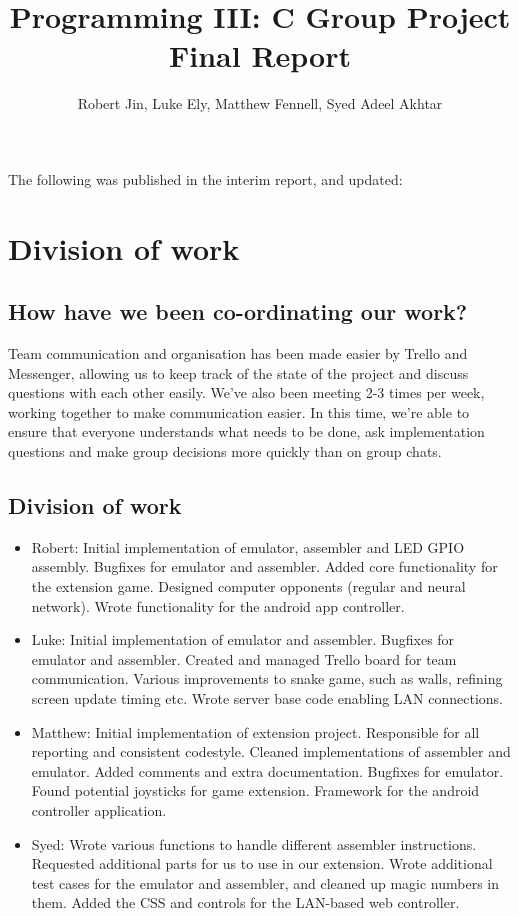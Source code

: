 \documentclass{article}
\begin{document}
\title{Programming III: C Group Project Final Report}
\author{Robert Jin, Luke Ely, Matthew Fennell, Syed Adeel Akhtar}
\maketitle
The following was published in the interim report, and updated:
\section{Division of work}
\subsection{How have we been co-ordinating our work?}
Team communication and organisation has been made easier by Trello and Messenger, allowing us to keep track of the state of the project and discuss questions with each other easily. We've also been meeting 2-3 times per week, working together to make communication easier. In this time, we're able to ensure that everyone understands what needs to be done, ask implementation questions and make group decisions more quickly than on group chats.\\
\subsection{Division of work}
\begin{itemize}
\item Robert: Initial implementation of emulator, assembler and LED GPIO assembly. Bugfixes for emulator and assembler. Added core functionality for the extension game. Designed computer opponents (regular and neural network). Wrote functionality for the android app controller.
\item Luke: Initial implementation of emulator and assembler. Bugfixes for emulator and assembler. Created and managed Trello board for team communication. Various improvements to snake game, such as walls, refining screen update timing etc. Wrote server base code enabling LAN connections.
\item Matthew: Initial implementation of extension project. Responsible for all reporting and consistent codestyle. Cleaned implementations of assembler and emulator. Added comments and extra documentation. Bugfixes for emulator. Found potential joysticks for game extension. Framework for the android controller application.
\item Syed: Wrote various functions to handle different assembler instructions. Requested additional parts for us to use in our extension. Wrote additional test cases for the emulator and assembler, and cleaned up magic numbers in them. Added the CSS and controls for the LAN-based web controller.
\end{itemize}
\end{document}
